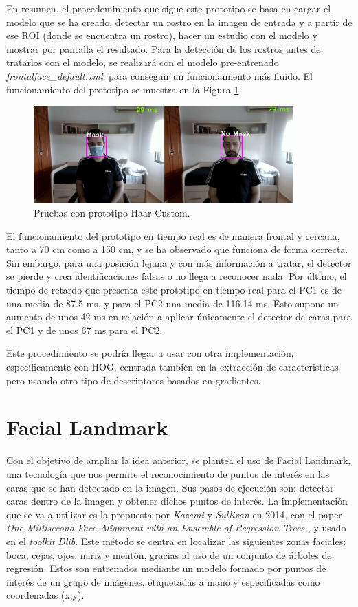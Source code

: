 En resumen, el procedeminiento que sigue este prototipo se basa en cargar el modelo que se ha creado, detectar un rostro en la imagen de entrada y a partir de ese ROI (donde se encuentra un rostro), hacer un estudio con el modelo y mostrar por pantalla el resultado. Para la detección de los rostros antes de tratarlos con el modelo, se realizará con el modelo pre-entrenado \textit{frontalface\_default.xml}, para conseguir un funcionamiento más fluido. El funcionamiento del prototipo se muestra en la Figura \ref{fig:haarCustom}.

\begin{figure}[htp]
	\centering
	\includegraphics[width=10cm]{imagenes/haarcustom_prueba.png}
	\caption{Pruebas con prototipo Haar Custom.}
	\label{fig:haarCustom}
\end{figure}

\vspace{-0.3cm}
El funcionamiento del prototipo en tiempo real es de manera frontal y cercana, tanto a 70 cm como a 150 cm, y se ha observado que funciona de forma correcta. Sin embargo, para una posición lejana y con más información a tratar, el detector se pierde y crea identificaciones falsas o no llega a reconocer nada. Por último, el tiempo de retardo que presenta este prototipo en tiempo real para el PC1 es de una media de 87.5 ms, y para el PC2 una media de 116.14 ms. Esto supone un aumento de unos 42 ms en relación a aplicar únicamente el detector de caras para el PC1 y de unos 67 ms para el PC2.

Este procedimiento se podría llegar a usar con otra implementación, específicamente con HOG, centrada también en la extracción de caracteristicas pero usando otro tipo de descriptores basados en gradientes.

\newpage
\section{Facial Landmark}
\vspace{-0.7cm}
Con el objetivo de ampliar la idea anterior, se plantea el uso de Facial Landmark, una tecnología que nos permite el reconocimiento de puntos de interés en las caras que se han detectado en la imagen. Sus pasos de ejecución son: detectar caras dentro de la imagen y obtener dichos puntos de interés. La implementación que se va a utilizar es la propuesta por \textit{Kazemi} y \textit{Sullivan} en 2014, con el paper \textit{One Millisecond Face Alignment with an Ensemble of Regression Trees} \cite{inproceedings}, y usado en el \textit{toolkit} \textit{Dlib}. Este método se centra en localizar las siguientes zonas faciales: boca, cejas, ojos, nariz y mentón, gracias al uso de un conjunto de árboles de regresión. Estos son entrenados mediante  un modelo formado por puntos de interés de un grupo de imágenes, etiquetadas a mano y especificadas como coordenadas (x,y). 

